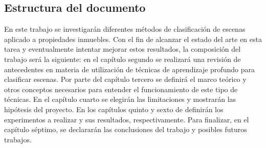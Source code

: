 \subsection{Estructura del documento}
En este trabajo se investigarán diferentes métodos de clasificación de escenas aplicado a propiedades inmuebles. Con el fin de alcanzar el estado del arte en esta tarea y eventualmente intentar mejorar estos resultados, la composición del trabajo será la siguiente: en el capítulo segundo se realizará una revisión de antecedentes en materia de utilización de técnicas de aprendizaje profundo para clasificar escenas. Por parte del capítulo tercero se definirá el marco teórico y otros conceptos necesarios para entender el funcionamiento de este tipo de técnicas. En el capítulo cuarto se elegirán las limitaciones y mostrarán las hipótesis del proyecto. En los capítulos quinto y sexto de definirán los experimentos a realizar y sus resultados, respectivamente. Para finalizar, en el capítulo séptimo, se declararán las conclusiones del trabajo y posibles futuros trabajos.	

